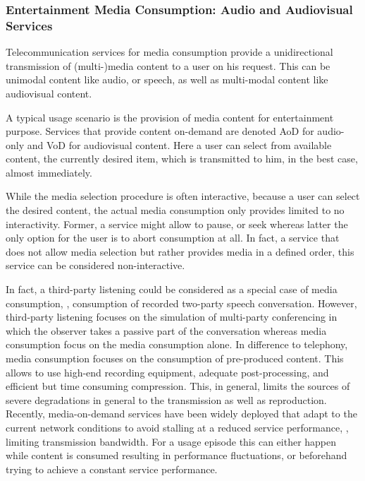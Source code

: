 \subsubsection{Entertainment Media Consumption: Audio and Audiovisual Services}
Telecommunication services for media consumption provide a unidirectional transmission of (multi-)media content to a user on his request.
This can be unimodal content like audio, or speech, as well as multi-modal content like audiovisual content.

A typical usage scenario is the provision of media content for entertainment purpose.
Services that provide content on-demand are denoted \ac{AoD} for audio-only and \ac{VoD} for audiovisual content.
Here a user can select from available content, the currently desired item, which is transmitted to him, in the best case, almost immediately.

While the media selection procedure is often interactive, because a user can select the desired content, the actual media consumption only provides limited to no interactivity.
Former, a service might allow to pause, or seek whereas latter the only option for the user is to abort consumption at all.
In fact, a service that does not allow media selection but rather provides media in a defined order, this service can be considered non-interactive.

In fact, a third-party listening could be considered as a special case of media consumption, \ie, consumption of recorded two-party speech conversation.
However, third-party listening focuses on the simulation of multi-party conferencing in which the observer takes a passive part of the conversation whereas media consumption focus on the media consumption alone.
In difference to telephony, media consumption focuses on the consumption of pre-produced content.
This allows to use high-end recording equipment, adequate post-processing, and efficient but time consuming compression.
This, in general, limits the sources of severe degradations in general to the transmission as well as reproduction.
Recently, media-on-demand services have been widely deployed that adapt to the current network conditions to avoid stalling at a reduced service performance, \eg, limiting transmission bandwidth.
For a usage episode this can either happen while content is consumed resulting in performance fluctuations, or beforehand trying to achieve a constant service performance.

